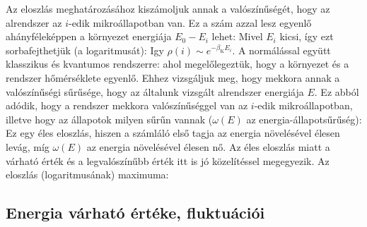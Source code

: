    Az eloszlás meghatározásához kiszámoljuk annak a valószínűségét, hogy az alrendszer az $i$-edik mikroállapotban van. Ez a szám azzal lesz egyenlő ahányféleképpen a környezet energiája $E_0-E_i$ lehet:
   Mivel $E_i$ kicsi, így ezt sorbafejthetjük (a logaritmusát):
   Igy $\rho(i)\sim e^{-\beta_\text{K} E_i}$. A normálással együtt klasszikus és kvantumos rendszerre:
   ahol megelőlegeztük, hogy a környezet és a rendszer hőmérséklete egyenlő. Ehhez vizsgáljuk meg, hogy mekkora annak a valószínűségi sűrűsége, hogy az általunk vizsgált alrendszer energiája $E$. Ez abból adódik, hogy a rendszer mekkora valószínűséggel van az $i$-edik mikroállapotban, illetve hogy az állapotok milyen sűrűn vannak ($\omega(E)$ az energia-állapotsűrűség): 
   Ez egy éles eloszlás, hiszen a számláló első tagja az energia növelésével élesen levág, míg $\omega(E)$ az energia növelésével élesen nő. Az éles eloszlás miatt a várható érték és a legvalószínűbb érték itt is jó közelítéssel megegyezik. Az eloszlás (logaritmusának) maximuma:
  
  \subsection{Energia várható értéke, fluktuációi}
   
